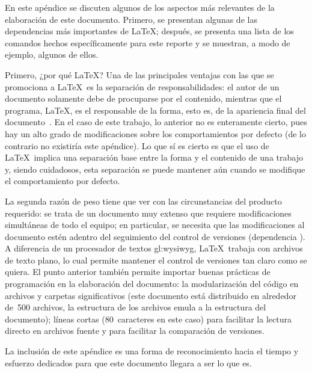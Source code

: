 %
%

%
%
En este apéndice se discuten algunos de los aspectos más relevantes de la
elaboración de este documento. Primero, se presentan algunas de las dependencias
más importantes de \LaTeX; después, se presenta una lista de los comandos hechos
específicamente para este reporte y se muestran, a modo de ejemplo, algunos de
ellos.

Primero, ¿por qué \LaTeX? Una de las principales ventajas con las que se
promociona a \LaTeX~es la separación de responsabilidades: el autor de un
documento solamente debe de procuparse por el contenido, mientras que el
programa, \LaTeX, es el responsable de la forma, esto es, de la apariencia
final del documento~\cite{introduccion_latex}. En el caso de este trabajo, lo
anterior no es enteramente cierto, pues hay un alto grado de modificaciones
sobre los comportamientos por defecto (de lo contrario no existiría este
apéndice). Lo que sí es cierto es que el uso de \LaTeX~implica una separación
base entre la forma y el contenido de una trabajo y, siendo cuidadosos, esta
separación se puede mantener aún cuando se modifique el comportamiento por
defecto.

La segunda razón de peso tiene que ver con las circunstancias del producto
requerido: se trata de un documento muy extenso que requiere modificaciones
simultáneas de todo el equipo; en particular, se necesita que las
modificaciones al documento estén adentro del seguimiento del control de
versiones (dependencia ). A diferencia de un procesador
de textos \gls{gl:wysiwyg}, \LaTeX~trabaja con archivos de texto plano, lo cual
permite mantener el control de versiones tan claro como se quiera. El punto
anterior también permite importar buenas prácticas de programación en la
elaboración del documento: la modularización del código en archivos y carpetas
significativos (este documento está distribuido en alrededor de~500 archivos,
la estructura de los archivos emula a la estructura del documento); líneas
cortas (80~caracteres en este caso) para facilitar la lectura directo en
archivos fuente y para facilitar la comparación de versiones.

La inclusión de este apéndice es una forma de reconocimiento hacia el tiempo y
esfuerzo dedicados para que este documento llegara a ser lo que es.

